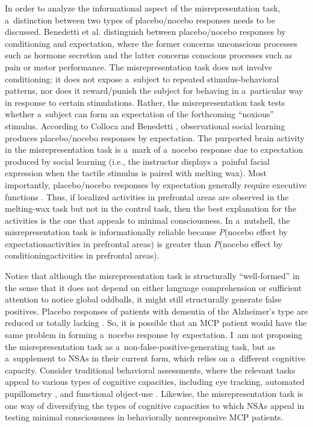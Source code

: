 In order to analyze the informational aspect of the misrepresentation task, a~distinction between two types of placebo/nocebo responses needs to be discussed. Benedetti et al.
\parencite*[][]{benedetti_conscious_2003} %
 distinguish between placebo/nocebo responses by conditioning and expectation, where the former concerns unconscious processes such as hormone secretion and the latter concerns conscious processes such as pain or motor performance. The misrepresentation task does not involve conditioning: it does not expose a~subject to repeated stimulus-behavioral patterns, nor does it reward/punish the subject for behaving in a~particular way in response to certain stimulations. Rather, the misrepresentation task tests whether a~subject can form an expectation of the forthcoming ``noxious'' stimulus. According to Colloca and Benedetti 
\parencite*[][]{colloca_placebo_2009}, %
 observational social learning produces placebo/nocebo responses by expectation. The purported brain activity in the misrepresentation task is a~mark of a~nocebo response due to expectation produced by social learning (i.e., the instructor displays a~painful facial expression when the tactile stimulus is paired with melting wax). Most importantly, placebo/nocebo responses by expectation generally require executive functions 
\parencite[][p.239]{benedetti_how_2011}. %
 Thus, if localized activities in prefrontal areas are observed in the melting-wax task but not in the control task, then the best explanation for the activities is the one that appeals to minimal consciousness. In a~nutshell, the misrepresentation task is informationally reliable because \textit{P}(nocebo effect by expectation{\textbar}activities in prefrontal areas) is greater than \textit{P}(nocebo effect by conditioning{\textbar}activities in prefrontal areas).

Notice that although the misrepresentation task is structurally ``well-formed'' in the sense that it does not depend on either language comprehension or sufficient attention to notice global oddballs, it might still structurally generate false positives. Placebo responses of patients with dementia of the Alzheimer's type are reduced or totally lacking
\parencite[][p.349]{benedetti_how_2011}. %
 So, it is possible that an MCP patient would have the same problem in forming a~nocebo response by expectation. I~am not proposing the misrepresentation task as a~non-false-positive-generating task, but as a~supplement to NSAs in their current form, which relies on a~different cognitive capacity. Consider traditional behavioral assessments, where the relevant tasks appeal to various types of cognitive capacities, including eye tracking, automated pupillometry 
\parencite[][]{vassilieva_automated_2019}, %
 and functional object-use 
\parencite[][]{sun_personalized_2018}. %
 Likewise, the misrepresentation task is one way of diversifying the types of cognitive capacities to which NSAs appeal in testing minimal consciousness in behaviorally nonresponsive MCP patients.

